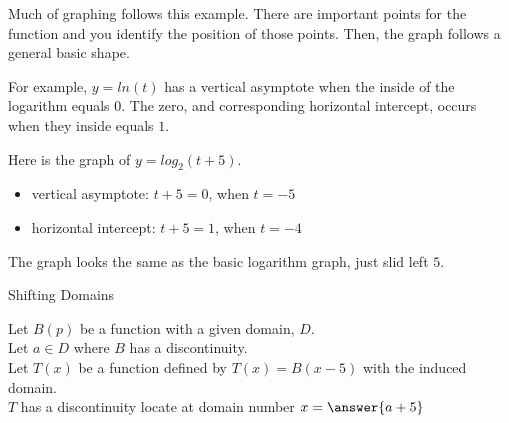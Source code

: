 \documentclass{ximera}
\begin{document}
Much of graphing follows this example.  There are important points for the function and you identify the position of those points.  Then, the graph follows a general basic shape.






For example, $y = ln(t)$ has a vertical asymptote when the inside of the logarithm equals $0$. The zero, and corresponding horizontal intercept, occurs when they inside equals $1$.  






\begin{example}

Here is the graph of $y = log_2(t+5)$.

\begin{itemize}
\item vertical asymptote: $t+5=0$, when $t=-5$
\item horizontal intercept: $t+5=1$, when $t=-4$
\end{itemize}


\begin{image}
\end{image}


The graph looks the same as the basic logarithm graph, just slid left $5$.




\end{example}









\begin{example} Shifting Domains

Let $B(p)$ be a function with a given domain, $D$. \\
Let $a \in D$ where $B$ has a discontinuity. \\
Let $T(x)$ be a function defined by $T(x) = B(x-5)$ with the induced domain. \\

$T$ has a discontinuity locate at domain number $x = \answer{a+5}$


\end{example}
\end{document}
